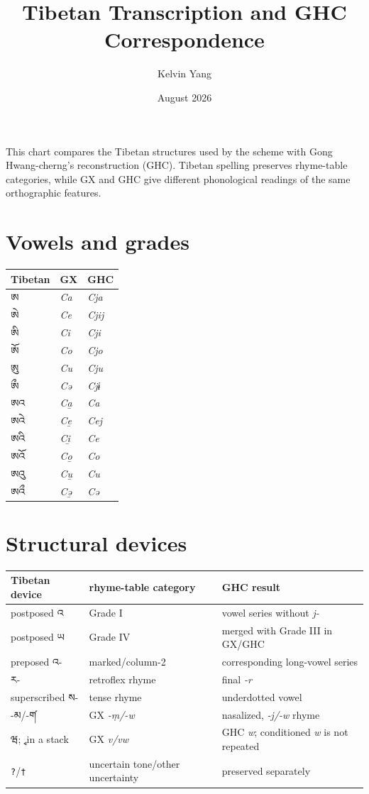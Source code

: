 \documentclass[12pt]{nextart}
\title{Tibetan Transcription and GHC Correspondence}\author{Kelvin Yang}\date{August 2026}
\begin{document}
\maketitle
This chart compares the Tibetan structures used by the scheme with Gong Hwang-cherng’s reconstruction (GHC). Tibetan spelling preserves rhyme-table categories, while GX and GHC give different phonological readings of the same orthographic features.

\section{Vowels and grades}
\begin{center}\begin{tabular}{lll}\toprule Tibetan & GX & GHC \\\midrule
ཨ & \emph{Ca} & \emph{Cja} \\ ཨེ & \emph{Ce} & \emph{Cjij} \\ ཨི & \emph{Ci} & \emph{Cji} \\ ཨོ & \emph{Co} & \emph{Cjo} \\ ཨུ & \emph{Cu} & \emph{Cju} \\ ཨྀ & \emph{Cə} & \emph{Cjɨ} \\
ཨའ & \emph{Ca̱} & \emph{Ca} \\ ཨའེ & \emph{Ce̱} & \emph{Cej} \\ ཨའི & \emph{Ci̱} & \emph{Ce} \\ ཨའོ & \emph{Co̱} & \emph{Co} \\ ཨའུ & \emph{Cu̱} & \emph{Cu} \\ ཨའྀ & \emph{Cə̱} & \emph{Cə} \\\bottomrule
\end{tabular}\end{center}

\section{Structural devices}
\begin{center}\small\begin{tabular}{lll}\toprule Tibetan device & rhyme-table category & GHC result \\\midrule
postposed འ & Grade I & vowel series without \emph{j-} \\ postposed ཡ & Grade IV & merged with Grade III in GX/GHC \\ preposed འ- & marked/column-2 & corresponding long-vowel series \\ ར- & retroflex rhyme & final \emph{-r} \\ superscribed ས- & tense rhyme & underdotted vowel \\ -མ/-ག༹ & GX \emph{-ṃ/-w} & nasalized, \emph{-j/-w} rhyme \\ ཝ; ྭ in a stack & GX \emph{v/vw} & GHC \emph{w}; conditioned \emph{w} is not repeated \\ \texttt{?}/\texttt{†} & uncertain tone/other uncertainty & preserved separately \\\bottomrule
\end{tabular}\end{center}
\end{document}
